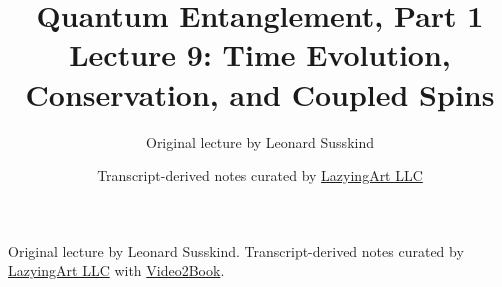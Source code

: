 \documentclass[11pt,oneside]{book}
\begin{document}
\frontmatter
\title{Quantum Entanglement, Part 1\\Lecture 9: Time Evolution, Conservation, and Coupled Spins}
\author{Original lecture by Leonard Susskind}
\date{Transcript-derived notes curated by \href{https://lazying.art}{LazyingArt LLC}}
\maketitle
\begin{center}
\small Original lecture by Leonard Susskind. Transcript-derived notes curated by \href{https://lazying.art}{LazyingArt LLC} with \href{https://github.com/lachlanchen/Video2Book}{Video2Book}.
\end{center}
\clearpage
\mainmatter

\end{document}
